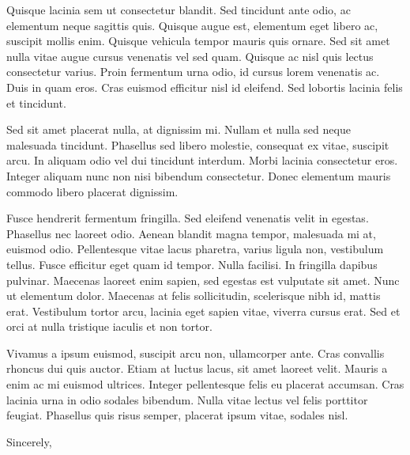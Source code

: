 \documentclass[11pt]{cicsletter}
\begin{document}
\begin{letter}
    Quisque lacinia sem ut consectetur blandit. Sed tincidunt ante odio, ac elementum neque sagittis quis. Quisque augue est, elementum eget libero ac, suscipit mollis enim. Quisque vehicula tempor mauris quis ornare. Sed sit amet nulla vitae augue cursus venenatis vel sed quam. Quisque ac nisl quis lectus consectetur varius. Proin fermentum urna odio, id cursus lorem venenatis ac. Duis in quam eros. Cras euismod efficitur nisl id eleifend. Sed lobortis lacinia felis et tincidunt.

    Sed sit amet placerat nulla, at dignissim mi. Nullam et nulla sed neque malesuada tincidunt. Phasellus sed libero molestie, consequat ex vitae, suscipit arcu. In aliquam odio vel dui tincidunt interdum. Morbi lacinia consectetur eros. Integer aliquam nunc non nisi bibendum consectetur. Donec elementum mauris commodo libero placerat dignissim.

    Fusce hendrerit fermentum fringilla. Sed eleifend venenatis velit in egestas. Phasellus nec laoreet odio. Aenean blandit magna tempor, malesuada mi at, euismod odio. Pellentesque vitae lacus pharetra, varius ligula non, vestibulum tellus. Fusce efficitur eget quam id tempor. Nulla facilisi. In fringilla dapibus pulvinar. Maecenas laoreet enim sapien, sed egestas est vulputate sit amet. Nunc ut elementum dolor. Maecenas at felis sollicitudin, scelerisque nibh id, mattis erat. Vestibulum tortor arcu, lacinia eget sapien vitae, viverra cursus erat. Sed et orci at nulla tristique iaculis et non tortor.

    Vivamus a ipsum euismod, suscipit arcu non, ullamcorper ante. Cras convallis rhoncus dui quis auctor. Etiam at luctus lacus, sit amet laoreet velit. Mauris a enim ac mi euismod ultrices. Integer pellentesque felis eu placerat accumsan. Cras lacinia urna in odio sodales bibendum. Nulla vitae lectus vel felis porttitor feugiat. Phasellus quis risus semper, placerat ipsum vitae, sodales nisl.

    \closing{Sincerely,}

\end{letter}
\end{document}
